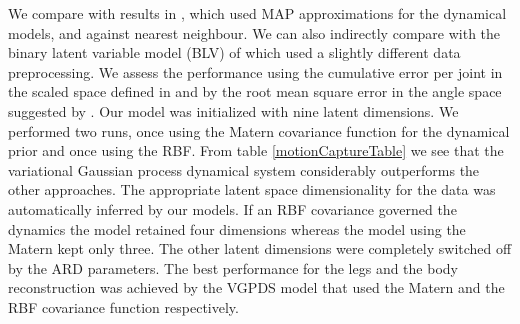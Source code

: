 \documentclass{article} %
\begin{document}
We compare with results in \cite{gplvmLarger}, which used MAP
approximations for the dynamical models, and against nearest
neighbour. We can also indirectly compare with the binary latent
variable model (BLV) of \cite{Taylor} which used a slightly different
data preprocessing. We assess the performance using the cumulative
error per joint in the scaled space defined in \cite{Taylor} and by
the root mean square error in the angle space suggested by
\cite{gplvmLarger}. Our model was initialized with nine latent
dimensions. We performed two runs, once using the Matern covariance
function for the dynamical prior and once using the RBF. From table
\ref{motionCaptureTable} we see that the variational Gaussian process
dynamical system considerably outperforms the other approaches.
%
The appropriate latent space dimensionality for the data was
automatically inferred by our models. If an RBF covariance governed
the dynamics the model retained four dimensions whereas the model
using the Matern kept only three.
%
%
The other latent dimensions were completely switched off by the ARD
parameters.  The best performance for the legs and the body
reconstruction was achieved by the VGPDS model that used the Matern
and the RBF covariance function respectively.


\end{document}
